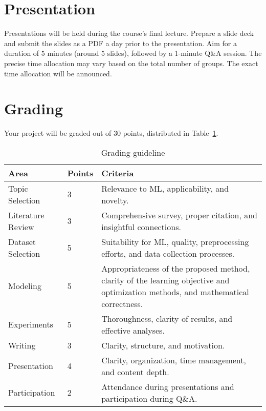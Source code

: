 \documentclass{article}
\begin{document}
\section{Presentation}
Presentations will be held during the course's final lecture. Prepare a slide deck and submit the slides as a PDF a day prior to the presentation. Aim for a duration of 5 minutes (around 5 slides), followed by a 1-minute Q\&A session. The precise time allocation may vary based on the total number of groups. The exact time allocation will be announced.

\section{Grading}
Your project will be graded out of 30 points, distributed in Table~\ref{tab:grading}.

\begin{table}[h!]
\caption{Grading guideline}
\label{tab:grading}
\begin{tabular}{llp{3.5in}}
\toprule
\textbf{Area} & \textbf{Points} & \textbf{Criteria} \\
\hline
Topic Selection & 3 & Relevance to ML, applicability, and novelty. \\
Literature Review & 3 & Comprehensive survey, proper citation, and insightful connections. \\
Dataset Selection & 5 & Suitability for ML, quality, preprocessing efforts, and data collection processes. \\
Modeling & 5 & Appropriateness of the proposed method, clarity of the learning objective and optimization methods, and mathematical correctness. \\
Experiments & 5 & Thoroughness, clarity of results, and effective analyses. \\
Writing & 3 & Clarity, structure, and motivation. \\
Presentation & 4 & Clarity, organization, time management, and content depth. \\
Participation & 2 & Attendance during presentations and participation during Q\&A.\\
\bottomrule
\end{tabular}
\end{table}



\end{document}
